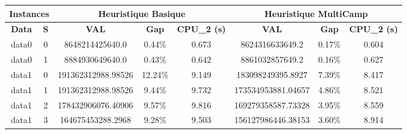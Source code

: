 \begin{table}[h!tbp]
    \centering\small
    \renewcommand{\arraystretch}{1.1}
    \begin{tabular}{|c|c||c|c|c||c|c|c|}
        \hline
        \multicolumn{2}{|c||}{\textbf{Instances}} & \multicolumn{3}{|c||}{\textbf{Heuristique Basique}} & \multicolumn{3}{|c|}{\textbf{Heuristique MultiCamp}}                                                                                                \\
        \hline
        \textbf{Data}                             & \textbf{S}                                          & \textbf{VAL}                                         & \textbf{Gap} & \textbf{CPU\_2 (s)} & \textbf{VAL}       & \textbf{Gap} & \textbf{CPU\_2 (s)} \\
        \hline
        data0                                     & 0                                                   & 8648214425640.0                                      & 0.44\%       & 0.673               & 8624316633649.2    & 0.17\%       & 0.604               \\
        data0                                     & 1                                                   & 8884930649640.0                                      & 0.43\%       & 0.642               & 8861032857649.2    & 0.16\%       & 0.627               \\
        \hline
        data1                                     & 0                                                   & 191362312988.98526                                   & 12.24\%      & 9.149               & 183098249395.8927  & 7.39\%       & 8.417               \\
        data1                                     & 1                                                   & 191362312988.98526                                   & 9.44\%       & 9.732               & 173534953881.04657 & 4.86\%       & 8.521               \\
        data1                                     & 2                                                   & 178432906076.40906                                   & 9.57\%       & 9.816               & 169279358587.73328 & 3.95\%       & 8.559               \\
        data1                                     & 3                                                   & 164675453288.2968                                    & 9.28\%       & 9.503               & 156127986446.38153 & 3.60\%       & 8.914               \\

\end{tabular}
\end{table}
